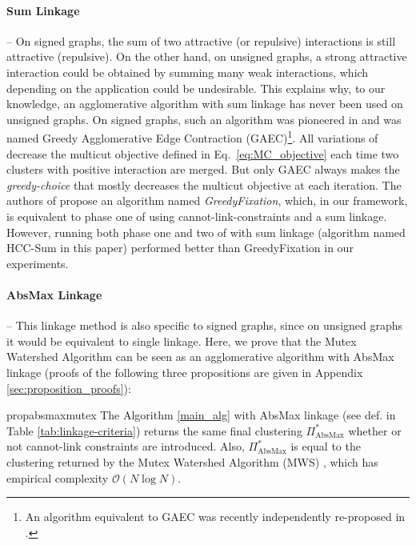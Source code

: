 \paragraph{Sum Linkage} -- 
On signed graphs, the sum of two attractive (or repulsive) interactions is still attractive (repulsive). On the other hand, on unsigned graphs, a strong attractive interaction could be obtained by summing many weak interactions, which depending on the application could be undesirable. This explains why, to our knowledge, an agglomerative algorithm with sum linkage has never been used on unsigned graphs. On signed graphs, such an algorithm was pioneered in \cite{levinkov2017comparative,keuper2015efficient} and was named Greedy Agglomerative Edge Contraction (GAEC)\footnote{An algorithm equivalent to GAEC was recently independently re-proposed in \cite{chehreghani2020hierarchical}.}. All variations of \algname{} decrease the multicut objective defined in Eq.~\ref{eq:MC_objective} each time two clusters with positive interaction are merged. But only GAEC always makes the \emph{greedy-choice} that mostly decreases the multicut objective at each iteration. The authors of \cite{levinkov2017comparative} propose an algorithm named \emph{GreedyFixation}, which, in our framework, is equivalent to phase one of \algname{} using cannot-link-constraints and a sum linkage. However, running both phase one and two of \algname{} with sum linkage (algorithm named HCC-Sum in this paper) performed better than GreedyFixation in our experiments.

\paragraph{AbsMax Linkage} -- This linkage method is also specific to signed graphs, since on unsigned graphs it would be equivalent to single linkage. Here, we prove that the Mutex Watershed Algorithm \cite{wolf2018mutex} can be seen as an agglomerative algorithm with AbsMax linkage (proofs of the following three propositions are given in Appendix \ref{sec:proposition_proofs}):
\begin{restatable}{prop}{absmaxmutex}
\label{prop:absmax_mutex}
The \algname{} Algorithm \ref{main_alg} with AbsMax linkage (see def. in Table \ref{tab:linkage-criteria}) returns the same final clustering $\Pi^*_{\mathrm{AbsMax}}$ whether or not cannot-link constraints are introduced. Also, $\Pi^*_{\mathrm{AbsMax}}$ is equal to the clustering returned by the Mutex Watershed Algorithm (MWS) \cite{wolf2018mutex}, which has empirical complexity $\mathcal{O}(N \log N)$. 
\end{restatable}


